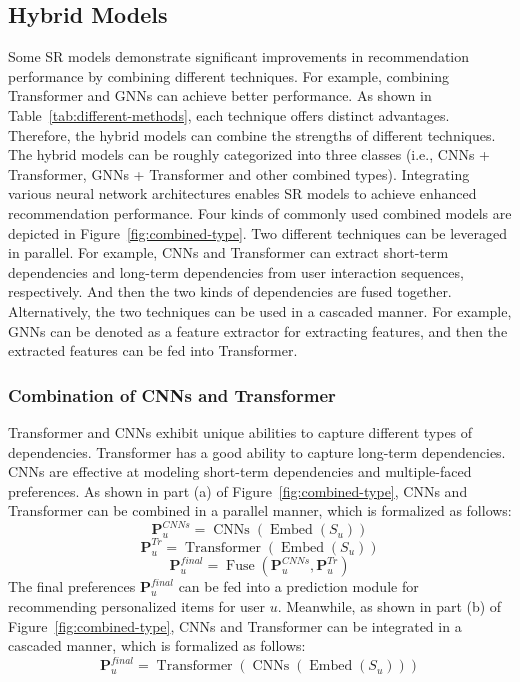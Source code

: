 \documentclass[review]{fcs}
\begin{document}
	\subsection{Hybrid Models}
	Some SR models demonstrate significant improvements in recommendation performance by combining different techniques. For example, combining Transformer and GNNs can achieve better performance. As shown in Table~\ref{tab:different-methods}, each technique offers distinct advantages. Therefore, the hybrid models can combine the strengths of different techniques. The hybrid models can be roughly categorized into three classes (i.e., CNNs + Transformer, GNNs + Transformer and other combined types). Integrating various neural network architectures enables SR models to achieve enhanced recommendation performance. Four kinds of commonly used combined models are depicted in Figure~\ref{fig:combined-type}. Two different techniques can be leveraged in parallel. For example, CNNs and Transformer can extract short-term dependencies and long-term dependencies from user interaction sequences, respectively. And then the two kinds of dependencies are fused together. Alternatively, the two techniques can be used in a cascaded manner. For example, GNNs can be denoted as a feature extractor for extracting features, and then the extracted features can be fed into Transformer.
	\subsubsection{Combination of CNNs and Transformer}
	Transformer and CNNs exhibit unique abilities to capture different types of dependencies. Transformer has a good ability to capture long-term dependencies. CNNs are effective at modeling short-term dependencies and multiple-faced preferences. As shown in part (a) of Figure~\ref{fig:combined-type}, CNNs and Transformer can be combined in a parallel manner, which is formalized as follows:
	\begin{equation}
		\mathbf{P}_{u}^{CNNs} = \operatorname{CNNs}(\operatorname{Embed}(S_{u}))
	\end{equation}
	\begin{equation}
		\mathbf{P}_{u}^{Tr} = \operatorname{Transformer}(\operatorname{Embed}(S_{u}))
	\end{equation}
	\begin{equation}
		\mathbf{P}_{u}^{final} = \operatorname{Fuse}(\mathbf{P}_{u}^{CNNs},\mathbf{P}_{u}^{Tr})
	\end{equation}
	The final preferences $\mathbf{P}_{u}^{final}$ can be fed into a prediction module for recommending personalized items for user $u$. Meanwhile, as shown in part (b) of Figure~\ref{fig:combined-type}, CNNs and Transformer can be integrated in a cascaded manner, which is formalized as follows:
	\begin{equation}
		\mathbf{P}_{u}^{final} = \operatorname{Transformer}(\operatorname{CNNs}(\operatorname{Embed}(S_{u})))
	\end{equation}
\end{document}
